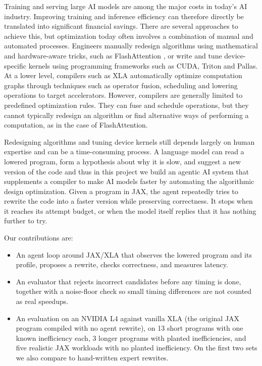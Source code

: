 \documentclass[conference]{IEEEtran}
\begin{document}
Training and serving large AI models are among the major costs in today's AI industry. Improving training and inference efficiency can therefore directly be translated into significant financial savings. There are several approaches to achieve this, but optimization today often involves a combination of manual and automated processes. Engineers manually redesign algorithms using mathematical and hardware-aware tricks, such as FlashAttention \cite{dao2022flashattention}, or write and tune device-specific kernels using programming frameworks such as CUDA, Triton and Pallas. At a lower level, compilers such as XLA automatically optimize computation graphs through techniques such as operator fusion, scheduling and lowering operations to target accelerators. However, compilers are generally limited to predefined optimization rules. They can fuse and schedule operations, but they cannot typically redesign an algorithm or find alternative ways of performing a computation, as in the case of FlashAttention. 

Redesigning algorithms and tuning device kernels still depends largely on human expertise and can be a time-consuming process. A language model can read a lowered program, form a hypothesis about why it is slow, and suggest a new version of the code and thus in this project we build an agentic AI system that supplements a compiler to make AI models faster by automating the algorithmic design optimization. Given a program in JAX, the agent repeatedly tries to rewrite the code into a faster version while preserving correctness. It stops when it reaches its attempt budget, or when the model itself replies that it has nothing further to try. 
\newline

Our contributions are:
\begin{itemize}
  \item {An agent loop around JAX/XLA that observes the lowered program and its profile, proposes a rewrite, checks correctness, and measures latency.
}
  \item {An evaluator that rejects incorrect candidates before any timing is done, together with a noise-floor check so small timing differences are not counted as real speedups.}

  \item {An evaluation on an NVIDIA L4 against vanilla XLA (the original JAX program compiled with no agent rewrite), on 13 short programs with one known inefficiency each, 3 longer programs with planted inefficiencies, and five realistic JAX workloads with no planted inefficiency. On the first two sets we also compare to hand-written expert rewrites.}
\end{itemize}
\end{document}
